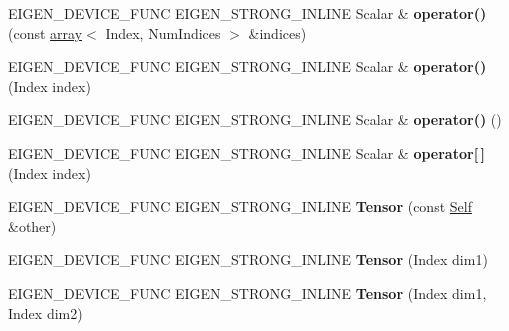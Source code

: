 \begin{DoxyCompactItemize}
\mbox{\label{class_eigen_1_1_tensor_a0bcabcda03b8acd8a7be6b639e95a7d4}} 
E\+I\+G\+E\+N\+\_\+\+D\+E\+V\+I\+C\+E\+\_\+\+F\+U\+NC E\+I\+G\+E\+N\+\_\+\+S\+T\+R\+O\+N\+G\+\_\+\+I\+N\+L\+I\+NE Scalar \& {\bfseries operator()} (const \hyperlink{class_eigen_1_1array}{array}$<$ Index, Num\+Indices $>$ \&indices)
\item 
\mbox{\label{class_eigen_1_1_tensor_ab70ba0dba7198318e91a2cc09e2c7c35}} 
E\+I\+G\+E\+N\+\_\+\+D\+E\+V\+I\+C\+E\+\_\+\+F\+U\+NC E\+I\+G\+E\+N\+\_\+\+S\+T\+R\+O\+N\+G\+\_\+\+I\+N\+L\+I\+NE Scalar \& {\bfseries operator()} (Index index)
\item 
\mbox{\label{class_eigen_1_1_tensor_a2f2a549d0c385bb22fde021360eaa092}} 
E\+I\+G\+E\+N\+\_\+\+D\+E\+V\+I\+C\+E\+\_\+\+F\+U\+NC E\+I\+G\+E\+N\+\_\+\+S\+T\+R\+O\+N\+G\+\_\+\+I\+N\+L\+I\+NE Scalar \& {\bfseries operator()} ()
\item 
\mbox{\label{class_eigen_1_1_tensor_a19e911b02b2f4dc82e357952738510ed}} 
E\+I\+G\+E\+N\+\_\+\+D\+E\+V\+I\+C\+E\+\_\+\+F\+U\+NC E\+I\+G\+E\+N\+\_\+\+S\+T\+R\+O\+N\+G\+\_\+\+I\+N\+L\+I\+NE Scalar \& {\bfseries operator\mbox{[}$\,$\mbox{]}} (Index index)
\item 
\mbox{\label{class_eigen_1_1_tensor_a026fd6efc7b9c148b095072a4d162136}} 
E\+I\+G\+E\+N\+\_\+\+D\+E\+V\+I\+C\+E\+\_\+\+F\+U\+NC E\+I\+G\+E\+N\+\_\+\+S\+T\+R\+O\+N\+G\+\_\+\+I\+N\+L\+I\+NE {\bfseries Tensor} (const \hyperlink{class_eigen_1_1_tensor}{Self} \&other)
\item 
\mbox{\label{class_eigen_1_1_tensor_aee17d8f1e07d6acbbea1d596dc1d686a}} 
E\+I\+G\+E\+N\+\_\+\+D\+E\+V\+I\+C\+E\+\_\+\+F\+U\+NC E\+I\+G\+E\+N\+\_\+\+S\+T\+R\+O\+N\+G\+\_\+\+I\+N\+L\+I\+NE {\bfseries Tensor} (Index dim1)
\item 
\mbox{\label{class_eigen_1_1_tensor_aa374eb9affbb9eaca1dfb2ea1db5d9ef}} 
E\+I\+G\+E\+N\+\_\+\+D\+E\+V\+I\+C\+E\+\_\+\+F\+U\+NC E\+I\+G\+E\+N\+\_\+\+S\+T\+R\+O\+N\+G\+\_\+\+I\+N\+L\+I\+NE {\bfseries Tensor} (Index dim1, Index dim2)
\item 
\mbox{\label{class_eigen_1_1_tensor_abfe3743ba57e94dc52a2b4fa39452acb}} 

\end{DoxyCompactItemize}
